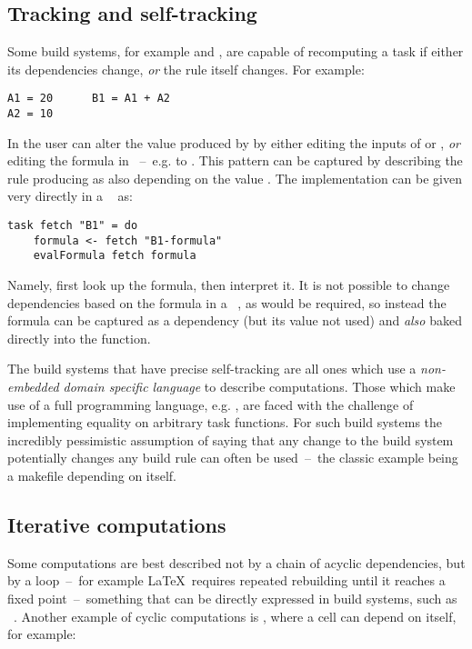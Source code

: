 \subsection{Tracking and self-tracking}\label{sec-tracking-aspects}

Some build systems, for example \Excel and \Ninja, are capable of recomputing a task if either its dependencies change, \emph{or} the rule itself changes. For example:

\begin{verbatim}
A1 = 20      B1 = A1 + A2
A2 = 10
\end{verbatim}

\noindent
In \Excel the user can alter the value produced by  by either editing
the inputs of  or , \emph{or} editing the formula in
~--~e.g. to . This pattern can be captured by describing
the rule producing  as also depending on the value .
The implementation can be given very directly in a ~ as:

\begin{verbatim}
task fetch "B1" = do
    formula <- fetch "B1-formula"
    evalFormula fetch formula
\end{verbatim}

\noindent
Namely, first look up the formula, then interpret it. It is not possible to
change dependencies based on the formula in a ~, as
would be required, so instead the formula can be captured as a dependency
(but its value not used) and \emph{also} baked directly into the 
function.

The build systems that have precise self-tracking are all ones which use a
\emph{non-embedded domain specific language} to describe computations.
Those which make use of a full programming language, e.g. \Shake, are faced with
the challenge of implementing equality on arbitrary task functions. For such
build systems the incredibly pessimistic assumption of saying that any change to
the build system potentially changes any build rule can often be used~--~the
classic example being a makefile depending on itself.

\subsection{Iterative computations}\label{sec-iterative-compute}

Some computations are best described not by a chain of acyclic dependencies,
but by a loop~--~for example \LaTeX~requires repeated rebuilding until it
reaches a fixed point~--~something that can be directly expressed in build
systems, such as \Pluto~\cite{erdweg2015pluto}. Another example of cyclic
computations is \Excel, where a cell can depend on itself, for example:


